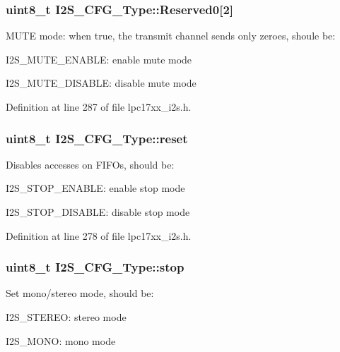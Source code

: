 \hypertarget{struct_i2_s___c_f_g___type_a98c6cd2e1d30b6b29638ddcf7183de8c}{
\subsubsection[{\-Reserved0}]{\setlength{\rightskip}{0pt plus 5cm}uint8\-\_\-t {\bf \-I2\-S\-\_\-\-C\-F\-G\-\_\-\-Type\-::\-Reserved0}\mbox{[}2\mbox{]}}}\label{struct_i2_s___c_f_g___type_a98c6cd2e1d30b6b29638ddcf7183de8c}
\-M\-U\-T\-E mode\-: when true, the transmit channel sends only zeroes, shoule be\-:
\begin{DoxyItemize}
\item \-I2\-S\-\_\-\-M\-U\-T\-E\-\_\-\-E\-N\-A\-B\-L\-E\-: enable mute mode
\item \-I2\-S\-\_\-\-M\-U\-T\-E\-\_\-\-D\-I\-S\-A\-B\-L\-E\-: disable mute mode 
\end{DoxyItemize}

\-Definition at line 287 of file lpc17xx\-\_\-i2s.\-h.

\hypertarget{struct_i2_s___c_f_g___type_a81125d449923180e93f24738873725ab}{
\subsubsection[{reset}]{\setlength{\rightskip}{0pt plus 5cm}uint8\-\_\-t {\bf \-I2\-S\-\_\-\-C\-F\-G\-\_\-\-Type\-::reset}}}\label{struct_i2_s___c_f_g___type_a81125d449923180e93f24738873725ab}
\-Disables accesses on \-F\-I\-F\-Os, should be\-:
\begin{DoxyItemize}
\item \-I2\-S\-\_\-\-S\-T\-O\-P\-\_\-\-E\-N\-A\-B\-L\-E\-: enable stop mode
\item \-I2\-S\-\_\-\-S\-T\-O\-P\-\_\-\-D\-I\-S\-A\-B\-L\-E\-: disable stop mode 
\end{DoxyItemize}

\-Definition at line 278 of file lpc17xx\-\_\-i2s.\-h.

\hypertarget{struct_i2_s___c_f_g___type_a5eb6c5c7757295ea877eed2418873a31}{
\subsubsection[{stop}]{\setlength{\rightskip}{0pt plus 5cm}uint8\-\_\-t {\bf \-I2\-S\-\_\-\-C\-F\-G\-\_\-\-Type\-::stop}}}\label{struct_i2_s___c_f_g___type_a5eb6c5c7757295ea877eed2418873a31}
\-Set mono/stereo mode, should be\-:
\begin{DoxyItemize}
\item \-I2\-S\-\_\-\-S\-T\-E\-R\-E\-O\-: stereo mode
\item \-I2\-S\-\_\-\-M\-O\-N\-O\-: mono mode 
\end{DoxyItemize}

